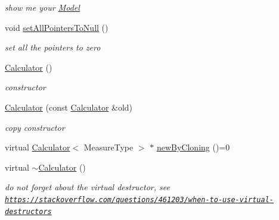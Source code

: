 \begin{DoxyCompactItemize}
\begin{DoxyCompactList}\small\item\em show me your \hyperlink{class_ox_1_1_model}{Model} \end{DoxyCompactList}\item 
\hypertarget{class_ox_1_1_calculator_acaaddad6379df03cccd825d565c9dd0e}{void \hyperlink{class_ox_1_1_calculator_acaaddad6379df03cccd825d565c9dd0e}{set\-All\-Pointers\-To\-Null} ()}\label{class_ox_1_1_calculator_acaaddad6379df03cccd825d565c9dd0e}

\begin{DoxyCompactList}\small\item\em set all the pointers to zero \end{DoxyCompactList}\item 
\hypertarget{class_ox_1_1_calculator_a4a3762f0c260cb0e34f72e40a7329d27}{\hyperlink{class_ox_1_1_calculator_a4a3762f0c260cb0e34f72e40a7329d27}{Calculator} ()}\label{class_ox_1_1_calculator_a4a3762f0c260cb0e34f72e40a7329d27}

\begin{DoxyCompactList}\small\item\em constructor \end{DoxyCompactList}\item 
\hypertarget{class_ox_1_1_calculator_a600434abcaff13ac70d0d4b06b9df583}{\hyperlink{class_ox_1_1_calculator_a600434abcaff13ac70d0d4b06b9df583}{Calculator} (const \hyperlink{class_ox_1_1_calculator}{Calculator} \&old)}\label{class_ox_1_1_calculator_a600434abcaff13ac70d0d4b06b9df583}

\begin{DoxyCompactList}\small\item\em copy constructor \end{DoxyCompactList}\item 
virtual \hyperlink{class_ox_1_1_calculator}{Calculator}$<$ Measure\-Type $>$ $\ast$ \hyperlink{class_ox_1_1_calculator_aaec48f39f9b0ea1b622485cf25fba484}{new\-By\-Cloning} ()=0
\item 
\hypertarget{class_ox_1_1_calculator_a0e0d0f525a80e54f17ab14e4073d780d}{virtual \hyperlink{class_ox_1_1_calculator_a0e0d0f525a80e54f17ab14e4073d780d}{$\sim$\-Calculator} ()}\label{class_ox_1_1_calculator_a0e0d0f525a80e54f17ab14e4073d780d}

\begin{DoxyCompactList}\small\item\em do not forget about the virtual destructor, see \href{https://stackoverflow.com/questions/461203/when-to-use-virtual-destructors}{\tt https\-://stackoverflow.\-com/questions/461203/when-\/to-\/use-\/virtual-\/destructors} \end{DoxyCompactList}\end{DoxyCompactItemize}
